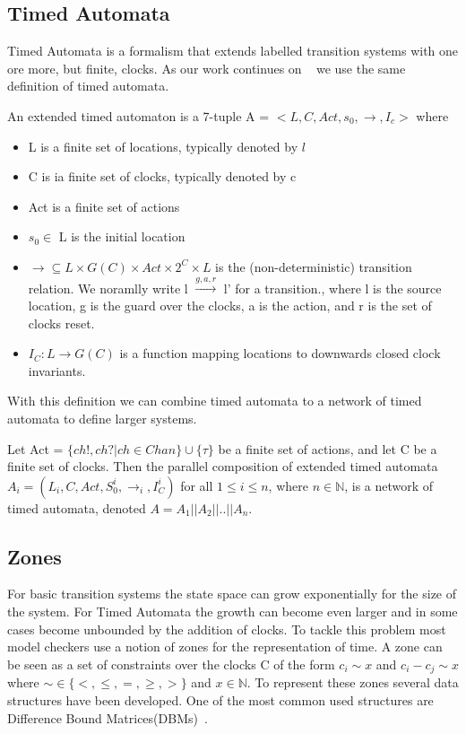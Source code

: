 \documentclass[11pt]{article}
\begin{document}
\subsection{Timed Automata}
Timed Automata is a formalism that extends labelled transition systems with one ore more, but finite, clocks. As our work continues on ~\cite{eemcs21972} we use the same definition of timed automata.
\begin{mydef}
\label{def:TA}
An extended timed automaton is a 7-tuple A = $<L, C, Act, s_0, \rightarrow, I_c>$ where
{\renewcommand\labelitemi{--}
	\begin{itemize}
		\item L is a finite set of locations, typically denoted by $l$
		\item C is ia finite set of clocks, typically denoted by c
		\item Act is a finite set of actions
		\item $s_0 \in$ L is the initial location
		\item $\rightarrow \subseteq L \times G(C) \times Act \times 2^C \times L$ is the (non-deterministic) transition relation. We noramlly write l $\stackrel{g,a,r}{\longrightarrow}$ l' for a transition., where l is the source location, g is the guard over the clocks, a is the action, and r is the set of clocks reset.
		\item $I_C : L \rightarrow G(C)$ is a function mapping locations to downwards closed clock invariants.
	\end{itemize}
}
\end{mydef}

With this definition we can combine timed automata to a network of timed automata to define larger systems.

\begin{mydef}
\label{def:networkTA}
Let Act = $\{ch!,ch?|ch \in Chan\} \cup \{\tau\}$ be a finite set of actions, and let C be a finite set of clocks. Then the parallel composition of extended timed automata $A_i = (L_i, C, Act, S^i_0, \rightarrow_{i}, I^i_C)$ for all $1 \leq i \leq n$, where $n \in \mathbb{N}$, is a network of timed automata, denoted $A = A_1||A_2||..||A_n$.
\end{mydef}

\subsection{Zones}
For basic transition systems the state space can grow exponentially for the size of the system. For Timed Automata the growth can become even larger and in some cases become unbounded by the addition of clocks. To tackle this problem most model checkers use a notion of zones for the representation of time. A zone can be seen as a set of constraints over the clocks C of the form $c_i \sim x$ and $c_i - c_j \sim x$ where $\sim  \in \{<, \leq, =, \geq, >\}$ and $x \in \mathbb{N}$. To represent these zones several data structures have been developed. One of the most common used structures are Difference Bound Matrices(DBMs)~\cite{dbmorig,bengtsson2002clocks}.
 
\end{document}
